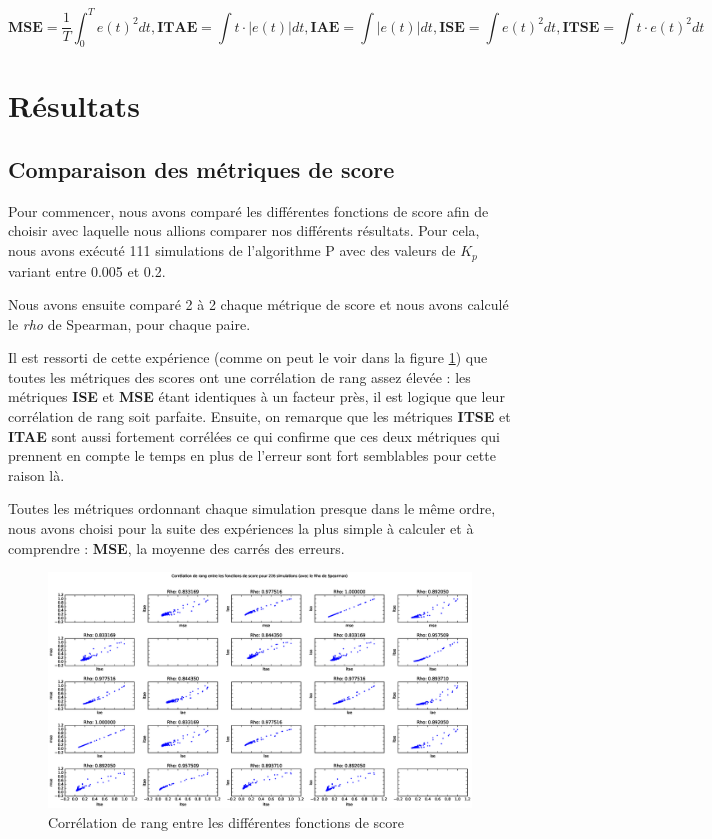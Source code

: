 \documentclass[a4paper,10pt]{report}
\begin{document}
$$
\textbf{MSE} = \frac{1}{T} \int_0^T e(t)^2 dt,
\textbf{ITAE} = \int t \cdot |e(t)| dt,
\textbf{IAE} = \int |e(t)| dt,
\textbf{ISE} = \int e(t)^2 dt,
\textbf{ITSE} = \int t \cdot e(t)^2 dt
$$


\section{Résultats}

\subsection{Comparaison des métriques de score}

Pour commencer, nous avons comparé les différentes fonctions de score afin de choisir avec laquelle nous allions comparer nos différents résultats. Pour cela, nous avons exécuté 111 simulations de l'algorithme P avec des valeurs de $K_p$ variant entre 0.005 et 0.2.

Nous avons ensuite comparé 2 à 2 chaque métrique de score et nous avons calculé le \textit{rho} de Spearman, pour chaque paire.


Il est ressorti de cette expérience (comme on peut le voir dans la figure \ref{fig:correlation}) que toutes les métriques des scores ont une corrélation de rang assez élevée :
les métriques \textbf{ISE} et \textbf{MSE} étant identiques à un facteur près, il est logique que leur corrélation de rang soit parfaite.
Ensuite, on remarque que les métriques \textbf{ITSE} et \textbf{ITAE} sont aussi fortement corrélées ce qui confirme que ces deux métriques qui prennent en compte le temps en plus de l'erreur sont fort semblables pour cette raison là.

Toutes les métriques ordonnant chaque simulation presque dans le même ordre,
nous avons choisi pour la suite des expériences la plus simple à calculer et à comprendre :
\textbf{MSE}, la moyenne des carrés des erreurs.

\begin{figure}[hb!]
   \centering
   \includegraphics[scale=0.35]{correlation.eps}
   \caption{\label{fig:correlation} Corrélation de rang entre les différentes fonctions de score}
\end{figure}
\end{document}
